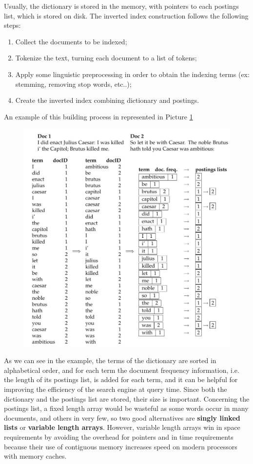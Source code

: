 Usually, the dictionary is stored in the memory, with pointers to each postings list, which is stored on disk. The inverted index construction follows the following steps:

\begin{enumerate}
    \item Collect the documents to be indexed;
    \item Tokenize the text, turning each document to a list of tokens;
    \item Apply some linguistic preprocessing in order to obtain the indexing terms (ex: stemming, removing stop words, etc..);
    \item Create the inverted index combining dictionary and postings.
\end{enumerate}

An example of this building process in represented in Picture \ref{inc_ex}

\begin{figure}[h!]
		\centering
		\includegraphics[scale = 0.8]{img/example_inverted index.jpg}
		\label{inc_ex}
\end{figure}

As we can see in the example, the terms of the dictionary are sorted in alphabetical order, and for each term the document frequency information, i.e. the length of its postings list, is added for each term, and it can be helpful for improving the efficiency of the search engine at query time. Since both the dictionary and the postings list are stored, their size is important. Concerning the postings list, a fixed length array would be wasteful as some words occur in many documents, and others in very few, so two good alternatives are \textbf{singly linked lists} or \textbf{variable length arrays}. However, variable length arrays win in space requirements by avoiding the overhead for pointers and in time requirements because their use of contiguous memory increases speed on modern processors with memory caches.

